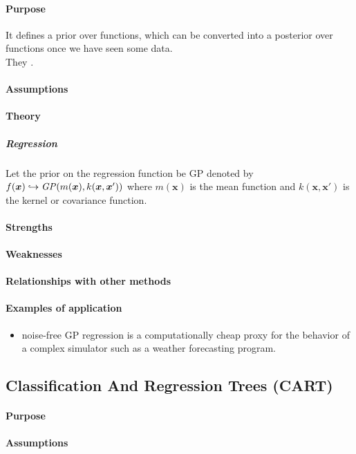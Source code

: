 \paragraph{Purpose}
It defines a prior over functions, which can be converted into a posterior over 
functions once we have seen some data.\\
They .
\paragraph{Assumptions}
\paragraph{Theory}
\subparagraph{Regression}
Let the prior on the regression function be GP denoted by
$f(\bm{x}) \hookrightarrow \text{\emph{GP}}(m(\bm{x}), k(\bm{x},\bm{x}'))$ where
$m(\bm{x})$ is the mean function and $k(\bm{x}, \bm{x}')$ is the kernel or covariance 
function.
\paragraph{Strengths}
\paragraph{Weaknesses}
\paragraph{Relationships with other methods}
\paragraph{Examples of application}
\begin{itemize}
    \item noise-free GP regression is a computationally cheap proxy for the behavior
        of a complex simulator such as a weather forecasting program.
\end{itemize}




\subsection{Classification And Regression Trees (CART)}
\paragraph{Purpose}
\paragraph{Assumptions}
